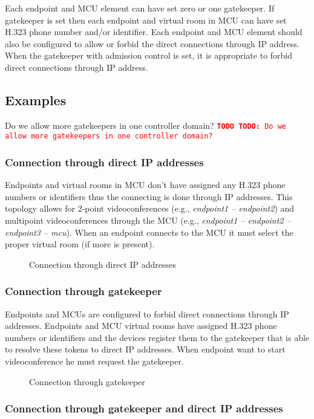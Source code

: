\documentclass[a4paper]{report}
\newcommand{\TODO}[1]{%
\def\empty{}%
\def\prvniparametr{#1}%
\ifx\prvniparametr\empty%
\begingroup\tt\textcolor{red}{\noindent\textbf{TODO}}\endgroup
\else%
\begingroup\tt\textcolor{red}{\noindent\textbf{TODO:}\ #1}\endgroup
\fi%
}
\newcommand{\graph}[4]{
\begin{figure}[h!]
\centering\scalebox{\ifx&#4& 0.75 \else #4 \fi}{}
\label{#1}
\caption{#3}
\end{figure}
}
\begin{document}
Each endpoint and MCU element can have set zero or one gatekeeper. If gatekeeper is set then each endpoint and virtual room in MCU can have set H.323 phone number and/or identifier. Each endpoint and MCU element should also be configured to allow or forbid the direct connections through IP address. When the gatekeeper with admission control is set, it is appropriate to forbid direct connections through IP address.


\subsection{Examples}

\TODO{Do we allow more gatekeepers in one controller domain?}

\subsubsection{Connection through direct IP addresses}

Endpoints and virtual rooms in MCU don't have assigned any H.323 phone numbers or identifiers thus the connecting is done through IP addresses. This topology allows for 2-point videoconferences (e.g., \emph{endpoint1 -- endpoint2}) and multipoint videoconferences through the MCU (e.g., \emph{endpoint1 -- endpoint2 -- endpoint3 -- mcu}). When an endpoint connects to the MCU it must select the proper virtual room (if more is present).

\graph{graph:h323:direct}{graph/h323_direct.tex}{Connection through direct IP addresses}{}


\subsubsection{Connection through gatekeeper}

Endpoints and MCUs are configured to forbid direct connections through IP addresses. Endpoints and MCU virtual rooms have assigned H.323 phone numbers or identifiers and the devices register them to the gatekeeper that is able to resolve these tokens to direct IP addresses. When endpoint want to start videoconference he must request the gatekeeper.

\graph{graph:h323:gatekeeper}{graph/h323_gatekeeper.tex}{Connection through gatekeeper}{}


\subsubsection{Connection through gatekeeper and direct IP addresses}
\end{document}
